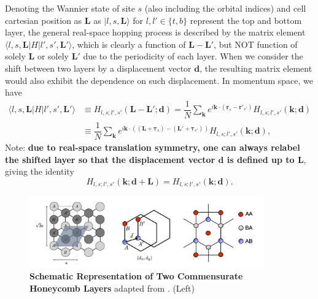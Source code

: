 Denoting the Wannier state of site $s$ (also including the orbital indices) and cell cartesian position as $\bm L$ as $|l,s,\bm L\rangle$ for $l,l'\in\{t,b\}$ represent the top and bottom layer, the general real-space hopping process is described by the matrix element $\langle l,s,\bm L|H|l',s',\bm L'\rangle$, which is clearly a function of $\bm L-\bm L'$, but NOT function of solely $\bm L$ or solely $\bm L'$ due to the periodicity of each layer. When we consider the shift between two layers by a displacement vector $\bm d$, the resulting matrix element would also exhibit the dependence on such displacement. In momentum space, we have
\begin{align}
    \langle l,s,\bm L|H|l',s',\bm L'\rangle & \equiv H_{l,s;l',s'}(\bm L-\bm L';\bm d) =\dfrac{1}{N}\sum_{\bm k}e^{i\bm k\cdot(\bm r_s-\bm r'_{s'})}H_{l,s;l',s'}(\bm k;\bm d) \nonumber             \\
                                            & \equiv\dfrac{1}{N}\sum_{\bm k}e^{i\bm k\cdot((\bm L+\bm\tau_s)-(\bm L'+\bm\tau_{s'}))} H_{l,s;l',s'}(\bm k;\bm d),\label{eq:real-space hopping matrix}
\end{align}
Note: \textbf{due to real-space translation symmetry, one can always relabel the shifted layer so that the displacement vector $\bm d$ is defined up to $\bm L$}, giving the identity
\begin{equation}\label{eq:bilayer displacement vector periodicity}
    H_{l,s;l',s'}(\bm k;\bm d+\bm L)=H_{l,s;l',s'}(\bm k;\bm d).
\end{equation}

\begin{figure}[!htp]
    \centering
    \includegraphics[width=0.9\textwidth]{figures/AA-AB-BA_stacking.png}
    \caption{\textbf{Schematic Representation of Two Commensurate Honeycomb Layers} adapted from \cite{jung2014ab}. (Left) }
    \label{fig:AA-AB-BA_stacking}
\end{figure}

